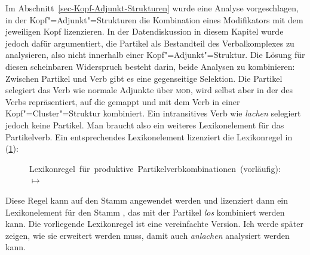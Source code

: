 Im Abschnitt~\ref{sec-Kopf-Adjunkt-Strukturen} wurde eine Analyse vorgeschlagen,
in der Kopf"=Adjunkt"=Strukturen die Kombination eines Modifikators mit dem jeweiligen Kopf lizenzieren.
In der Datendiskussion in diesem Kapitel wurde jedoch dafür argumentiert,
die Partikel als Bestandteil des Verbalkomplexes zu analysieren, also nicht innerhalb einer
Kopf"=Adjunkt"=Struktur. Die Lösung für diesen scheinbaren Widerspruch besteht darin, beide Analysen zu kombinieren: Zwischen Partikel
und Verb gibt es eine gegenseitige Selektion. Die Partikel selegiert das Verb wie normale
Adjunkte über \textsc{mod}, wird selbst aber in der \argstl des Verbs repräsentiert, auf die \compsl
gemappt und mit dem Verb in einer Kopf"=Cluster"=Struktur kombiniert. Ein intransitives Verb wie \emph{lachen} selegiert
jedoch keine Partikel. Man braucht also ein weiteres Lexikonelement für das Partikelverb.
Ein entsprechendes Lexikonelement lizenziert die Lexikonregel in (\ref{lr-pv-prel}):
%
\begin{figure}
\eas
\label{lr-pv-prel}%
\mbox{Lexikonregel für produktive Partikelverbkombinationen (vorläufig):}\\
\onems[stem]{
           synsem \ibox{1} \onems{ loc$|$cat \ms{ head & \type{verb} \\ 
                                                  arg-st & \ibox{2}\\
}
                                 } \\
         }  $\mapsto$ \\
\hfill{}%
%
\zs
\vspace{-1.5\baselineskip}
\end{figure}
Diese Regel kann auf den Stamm  angewendet werden
und lizenziert dann ein Lexikonelement für den Stamm , das mit der Partikel \emph{los}
kombiniert werden kann. Die vorliegende Lexikonregel ist eine vereinfachte Version. Ich werde später
zeigen, wie sie erweitert werden muss, damit auch \emph{anlachen} analysiert werden kann.

